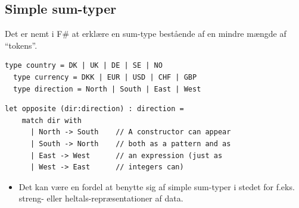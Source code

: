 \documentclass[rgb]{beamer}
\begin{document}
\subsection{Simple sum-typer}
\begin{frame}[fragile]
\begin{footnotesize}

  \vspace{1ex}

  Det er nemt i F\# at erklære en sum-type bestående af en mindre mængde af ``tokens''.

  \vspace{1ex}

\begin{lstlisting}[numbers=none,frame=none,mathescape]
  type country = DK | UK | DE | SE | NO
  type currency = DKK | EUR | USD | CHF | GBP
  type direction = North | South | East | West
\end{lstlisting}

  \vspace{1ex}

\begin{lstlisting}[numbers=none,frame=none,mathescape]
  let opposite (dir:direction) : direction =
    match dir with
      | North -> South    // A constructor can appear
      | South -> North    // both as a pattern and as
      | East -> West      // an expression (just as
      | West -> East      // integers can)
\end{lstlisting}

\begin{itemize}
\item Det kan være en fordel at benytte sig af simple sum-typer i
  stedet for f.eks. streng- eller heltals-repræsentationer af data.
\end{itemize}

\end{footnotesize}
\end{frame}
\end{document}
